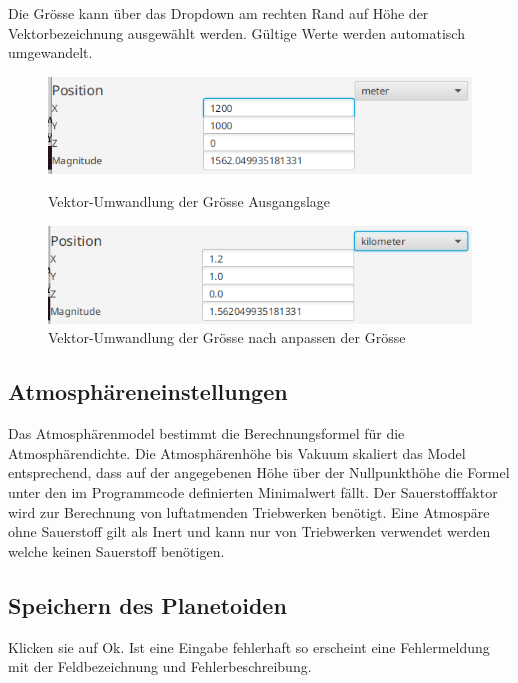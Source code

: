 Die Grösse kann über das Dropdown am rechten Rand auf Höhe der Vektorbezeichnung ausgewählt werden. Gültige Werte werden automatisch umgewandelt.

\begin{figure}[H]
	\centering
	\begin{minipage}[b]{0.45\textwidth}
		\includegraphics[width=\textwidth]{res/vecunit1.png}
		\caption{Vektor-Umwandlung der Grösse Ausgangslage}
	\end{minipage}
	\hfill
	\begin{minipage}[b]{0.45\textwidth}
		\includegraphics[width=\textwidth]{res/vecunit2.png}
		\caption{Vektor-Umwandlung der Grösse nach anpassen der Grösse}
	\end{minipage}
\end{figure}

\subsection{Atmosphäreneinstellungen}
\unimplemented
Das Atmosphärenmodel bestimmt die Berechnungsformel für die Atmosphärendichte.
Die Atmosphärenhöhe bis Vakuum skaliert das Model entsprechend, dass auf der angegebenen Höhe über der Nullpunkthöhe die Formel unter den im Programmcode definierten Minimalwert fällt.
Der Sauerstofffaktor wird zur Berechnung von luftatmenden Triebwerken benötigt. Eine Atmospäre ohne Sauerstoff gilt als Inert und kann nur von Triebwerken verwendet werden welche keinen Sauerstoff benötigen.

\subsection{Speichern des Planetoiden}
Klicken sie auf Ok.
Ist eine Eingabe fehlerhaft so erscheint eine Fehlermeldung mit der Feldbezeichnung und Fehlerbeschreibung.

